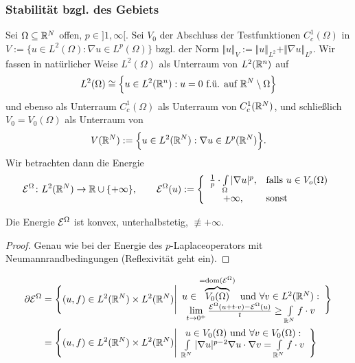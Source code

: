 \subsubsection{Stabilität bzgl. des Gebiets}

Sei $\Omega\subseteq\mathbb{R}^N$ offen, $p\in]1,\infty[$.
Sei $V_0$ der Abschluss der Testfunktionen $C_c^1(\Omega)$ in\\
$V:=\big\lbrace u\in L^2(\Omega):\nabla u\in L^p(\Omega)\big\rbrace$ bzgl. der Norm 
$\Vert u\Vert_V:=\Vert u\Vert_{L^2}+\Vert\nabla u\Vert_{L^p}$.
Wir fassen in natürlicher Weise $L^2(\Omega)$ als Unterraum von $L^2(\mathbb{R}^n)$ auf
\begin{align*}
	L^2(\Omega)\cong\Big\lbrace u\in L^2(\mathbb{R}^n):u=0\text{ f.ü. auf }\mathbb{R}^N\setminus\Omega\Big\rbrace
\end{align*}
und ebenso als Unterraum $C_c^1(\Omega)$ als Unterraum von $C_c^1(\mathbb{R}^N)$, 
und schließlich $V_0=V_0(\Omega)$ als Unterraum von
\begin{align*}
	V(\mathbb{R}^N):=\Big\lbrace u\in L^2(\mathbb{R}^N):\nabla u\in L^p(\mathbb{R}^N)\Big\rbrace.
\end{align*}
Wir betrachten dann die Energie 
\begin{align*}
	\mathcal{E}^\Omega\colon L^2(\mathbb{R}^N)\to\mathbb{R}\cup\lbrace+\infty\rbrace,\qquad
	\mathcal{E}^\Omega(u):=\left\lbrace\begin{array}{cl}
		\frac{1}{p}\cdot\int\limits_\Omega|\nabla u|^p,&\text{falls } u\in V_o(\Omega)\\
		+\infty,&\text{sonst }
	\end{array}\right.
\end{align*}

Die Energie $\mathcal{E}^\Omega$ ist konvex, unterhalbstetig, $\not\equiv+\infty$.

\begin{proof}
	Genau wie bei der Energie des $p$-Laplaceoperators mit Neumannrandbedingungen (Reflexivität geht ein).
\end{proof}

\begin{align*}
	\partial\mathcal{E}^\Omega&=\Bigg\lbrace(u,f)\in L^2(\mathbb{R}^N)\times L^2(\mathbb{R}^N)\Bigg|
	\begin{array}{c}
		u\in\overbrace{V_0(\Omega)}^{=\operatorname{dom}(\mathcal{E}^\Omega)}\text{ und }\forall v\in L^2(\mathbb{R}^N):\\
		\lim\limits_{t\to 0^+}\frac{\mathcal{E}^\Omega(u+t\cdot v)-\mathcal{E}^\Omega(u)}{t}\geq\int\limits_{\mathbb{R}^N} f\cdot v
	\end{array}\Bigg\rbrace\\
	&=\Bigg\lbrace(u,f)\in L^2(\mathbb{R}^N)\times L^2(\mathbb{R}^N)\Bigg|
	\begin{array}{c}
		u\in V_0(\Omega)\text{ und }\forall v\in V_0(\Omega):\\
		\int\limits_{\mathbb{R}^N}|\nabla u|^{p-2}\nabla u\cdot\nabla v=\int\limits_{\mathbb{R}^N} f\cdot v
	\end{array}		
	\Bigg\rbrace
\end{align*}

